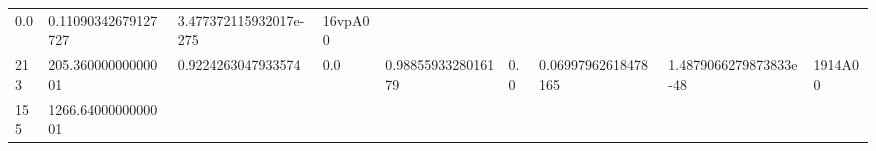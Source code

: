 \documentclass[11pt,a4paper,twoside]{book}
\theoremstyle{definition}
\theoremstyle{definition}
\theoremstyle{remark}
\begin{document}
\begin{longtable}[]{@{}lllllllll@{}}
\begin{minipage}[t]{0.04\columnwidth}
0.0\strut
\end{minipage} & \begin{minipage}[t]{0.04\columnwidth}\raggedright\strut
0.11090342679127727\strut
\end{minipage} & \begin{minipage}[t]{0.04\columnwidth}\raggedright\strut
3.477372115932017e-275\strut
\end{minipage} & \begin{minipage}[t]{0.04\columnwidth}\raggedright\strut
16vpA00\strut
\end{minipage}\tabularnewline
\begin{minipage}[t]{0.04\columnwidth}\raggedright\strut
213\strut
\end{minipage} & \begin{minipage}[t]{0.04\columnwidth}\raggedright\strut
205.36000000000001\strut
\end{minipage} & \begin{minipage}[t]{0.04\columnwidth}\raggedright\strut
0.9224263047933574\strut
\end{minipage} & \begin{minipage}[t]{0.04\columnwidth}\raggedright\strut
0.0\strut
\end{minipage} & \begin{minipage}[t]{0.04\columnwidth}\raggedright\strut
0.9885593328016179\strut
\end{minipage} & \begin{minipage}[t]{0.04\columnwidth}\raggedright\strut
0.0\strut
\end{minipage} & \begin{minipage}[t]{0.04\columnwidth}\raggedright\strut
0.06997962618478165\strut
\end{minipage} & \begin{minipage}[t]{0.04\columnwidth}\raggedright\strut
1.4879066279873833e-48\strut
\end{minipage} & \begin{minipage}[t]{0.04\columnwidth}\raggedright\strut
1914A00\strut
\end{minipage}\tabularnewline
\begin{minipage}[t]{0.04\columnwidth}\raggedright\strut
155\strut
\end{minipage} & \begin{minipage}[t]{0.04\columnwidth}\raggedright\strut
1266.6400000000001\strut
\end{minipage} & \begin{minipage}[t]{0.04\columnwidth}\raggedright\strut

\end{minipage}
\end{longtable}
\end{document}

